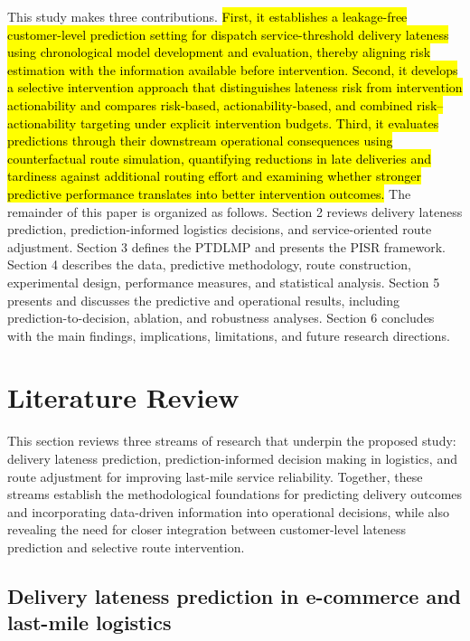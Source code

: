 \documentclass[11pt,a4paper]{article}
\begin{document}
This study makes three contributions. \hl{First, it establishes a
leakage-free customer-level prediction setting for dispatch service-threshold
delivery lateness using chronological model development and evaluation,
thereby aligning risk estimation with the information available before
intervention. Second, it develops a selective intervention approach that
distinguishes lateness risk from intervention actionability and compares
risk-based, actionability-based, and combined risk--actionability
targeting under explicit intervention budgets. Third, it evaluates
predictions through their downstream operational consequences using
counterfactual route simulation, quantifying reductions in late
deliveries and tardiness against additional routing effort and examining
whether stronger predictive performance translates into better
intervention outcomes.} The remainder of this paper is organized as
follows. Section 2 reviews delivery lateness prediction,
prediction-informed logistics decisions, and service-oriented route
adjustment. Section 3 defines the PTDLMP and presents the PISR
framework. Section 4 describes the data, predictive methodology, route
construction, experimental design, performance measures, and statistical
analysis. Section 5 presents and discusses the predictive and
operational results, including prediction-to-decision, ablation, and
robustness analyses. Section 6 concludes with the main findings,
implications, limitations, and future research directions.

\section{Literature Review}\label{sec:literature-review}

This section reviews three streams of research that underpin the
proposed study: delivery lateness prediction, prediction-informed
decision making in logistics, and route adjustment for improving
last-mile service reliability. Together, these streams establish the
methodological foundations for predicting delivery outcomes and
incorporating data-driven information into operational decisions, while
also revealing the need for closer integration between customer-level
lateness prediction and selective route intervention.

\subsection{Delivery lateness prediction in e-commerce and last-mile logistics}\label{sec:lit-prediction}
\end{document}
